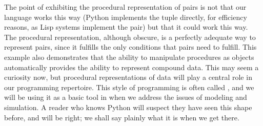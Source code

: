 The point of exhibiting the procedural representation of pairs is not that our
language works this way (Python implements the tuple directly, for efficiency
reasons, as Lisp systems implement the pair) but that it could work this way.
The procedural representation, although obscure, is a perfectly adequate way to
represent pairs, since it fulfills the only conditions that pairs need to
fulfill.  This example also demonstrates that the ability to manipulate
procedures as objects automatically provides the ability to represent compound
data.  This may seem a curiosity now, but procedural representations of data
will play a central role in our programming repertoire.  This style of
programming is often called , and we will be using it
as a basic tool in  when we address the issues of modeling and
simulation.  A reader who knows Python will suspect they have seen this shape
before, and will be right; we shall say plainly what it is when we get there.

